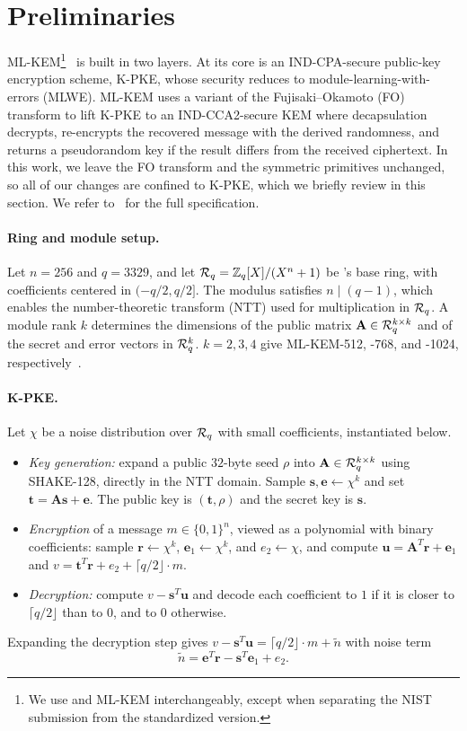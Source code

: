\section{Preliminaries}
\label{sec:preliminaries}

ML-KEM\footnote{We use \kyber and ML-KEM
interchangeably, except when separating the NIST submission from the standardized version.}~\cite{fips203} is built in two layers. 
At its core is an IND-CPA-secure public-key encryption scheme, K-PKE, whose security reduces to module-learning-with-errors (MLWE). ML-KEM uses a variant
of the Fujisaki--Okamoto (FO) transform to lift K-PKE to an IND-CCA2-secure KEM where decapsulation decrypts, re-encrypts the recovered message with the derived
randomness, and returns a pseudorandom key if the result differs from the received ciphertext. In this work, we leave the
FO transform and the symmetric primitives unchanged, so all of our changes are confined to K-PKE, which we briefly review in this section. 
We refer to~\cite{fips203} for the full specification.

\paragraph{Ring and module setup.} Let $n=256$ and $q=3329$, and let $\mathcal{R}_q=\mathbb{Z}_q[X]/(X^n+1)$ be \kyber's
base ring, with coefficients centered in $(-q/2,q/2]$. The modulus satisfies $n \mid (q-1)$, which enables the number-theoretic
transform (NTT) used for multiplication in $\mathcal{R}_q$. A module rank $k$ determines
the dimensions of the public matrix $\mathbf{A}\in \mathcal{R}_q^{k\times k}$ and of the secret and error vectors in $\mathcal{R}_q^k$.
$k=2,3,4$ give ML-KEM-512, -768, and -1024, respectively~\cite{fips203}.

\paragraph{K-PKE.} Let $\chi$ be a noise distribution over $\mathcal{R}_q$ with small coefficients, instantiated below.
\begin{itemize}
  \item \emph{Key generation:} expand a public $32$-byte seed $\rho$ into $\mathbf{A}\in \mathcal{R}_q^{k\times k}$ using SHAKE-128,
    directly in the NTT domain. Sample $\mathbf{s},\mathbf{e}\leftarrow\chi^k$ and set $\mathbf{t}=\mathbf{A}\mathbf{s}+\mathbf{e}$.
    The public key is $(\mathbf{t},\rho)$ and the secret key is $\mathbf{s}$.
  \item \emph{Encryption} of a message $m\in\{0,1\}^{n}$, viewed as a polynomial with binary coefficients: sample
    $\mathbf{r}\leftarrow\chi^k$, $\mathbf{e}_1\leftarrow\chi^k$, and $e_2\leftarrow\chi$, and compute
    $\mathbf{u}=\mathbf{A}^T\mathbf{r}+\mathbf{e}_1$ and $v=\mathbf{t}^T\mathbf{r}+e_2+\lceil q/2\rfloor\cdot m$.
  \item \emph{Decryption:} compute $v-\mathbf{s}^T\mathbf{u}$ and decode each coefficient to $1$ if it is closer to
    $\lceil q/2\rfloor$ than to $0$, and to $0$ otherwise.
\end{itemize}
Expanding the decryption step gives $v-\mathbf{s}^T\mathbf{u}=\lceil q/2\rfloor\cdot m+\tilde{n}$ with noise term
$$\tilde{n} = \mathbf{e}^T\mathbf{r} - \mathbf{s}^T\mathbf{e}_1 + e_2 .$$

